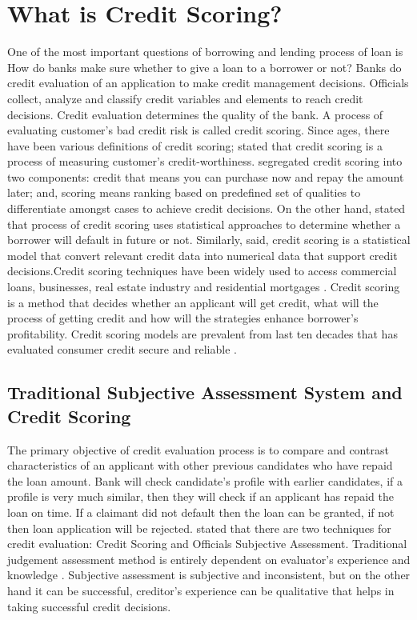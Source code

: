 {\section{What is Credit Scoring?}\label{C.risk}
One of the most important questions of borrowing and lending process of loan is How do banks make sure whether to give a loan to a borrower or not? Banks do credit evaluation of an application to make credit management decisions. Officials collect, analyze and classify credit variables and elements to reach credit decisions. Credit evaluation determines the quality of the bank. A process of evaluating customer's bad credit risk is called credit scoring. Since ages, there have been various definitions of credit scoring; \citet{hand1998consumer} stated that credit scoring is a process of measuring customer's credit-worthiness. \citet{anderson2007credit} segregated credit scoring into two components: credit that means you can purchase now and repay the amount later; and, scoring means ranking based on predefined set of qualities to differentiate amongst cases to achieve credit decisions. On the other hand, \citet{gup2005commercial} stated that process of credit scoring uses statistical approaches to determine whether a borrower will default in future or not. Similarly, \citet{beynon2005optimizing} said, credit scoring is a statistical model that convert relevant credit data into numerical data that support credit decisions.Credit scoring techniques have been widely used to access commercial loans, businesses, real estate industry and residential mortgages \citep{gup2005commercial}. Credit scoring is a method that decides whether an applicant will get credit, what will the process of getting credit and how will the strategies enhance borrower's profitability. Credit scoring models are prevalent from last ten decades that has evaluated consumer credit secure and reliable \citep{thomas2002credit}. 

\subsection{Traditional Subjective Assessment System and Credit Scoring}\label{C.risk2}
The primary objective of credit evaluation process is to compare and contrast characteristics of an applicant with other previous candidates who have repaid the loan amount. Bank will check candidate's profile with earlier candidates, if a profile is very much similar, then they will check if an applicant has repaid the loan on time. If a claimant did not default then the loan can be granted, if not then loan application will be rejected. \citet{crook1996credit} stated that there are two techniques for credit evaluation: Credit Scoring and Officials Subjective Assessment. Traditional judgement assessment method is entirely dependent on evaluator's experience and knowledge \citep{sullivan1981consumer,bailey2004consumer}. Subjective assessment is subjective and inconsistent, but on the other hand it can be successful, creditor's experience can be qualitative that helps in taking successful credit decisions.\\

}
